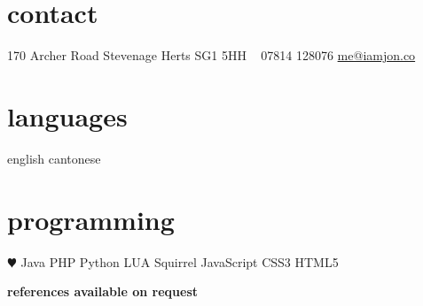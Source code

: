\documentclass[]{cv-template}
\begin{document}


\begin{aside} %
\section{contact}
170 Archer Road
Stevenage
Herts
SG1 5HH
~
07814 128076
\href{mailto:me@iamjon.co}{me@iamjon.co}
\section{languages}
english
cantonese
\section{programming}
{\color{red} $\varheartsuit$} Java
PHP
Python
LUA
Squirrel
JavaScript
CSS3
HTML5
\end{aside}






\textbf{\LARGE references available on request}
\end{document}
